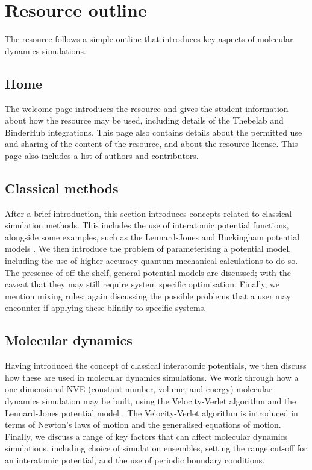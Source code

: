\documentclass[amsmath,amssymb,twocolumn,superscriptaddress]{revtex4-1}
\begin{document}
\section{Resource outline}

The resource follows a simple outline that introduces key aspects of molecular dynamics simulations.

\subsection{Home}

The welcome page introduces the resource and gives the student information about how the resource may be used, including details of the Thebelab and BinderHub integrations.
This page also contains details about the permitted use and sharing of the content of the resource, and about the resource license.
This page also includes a list of authors and contributors.

\subsection{Classical methods}

After a brief introduction, this section introduces concepts related to classical simulation methods.
This includes the use of interatomic potential functions, alongside some examples, such as the Lennard-Jones and Buckingham potential models \cite{lennard-jones_determination_1924,buckingham_classical_1938}.
We then introduce the problem of parameterising a potential model, including the use of higher accuracy quantum mechanical calculations to do so.
The presence of off-the-shelf, general potential models are discussed; with the caveat that they may still require system specific optimisation.
Finally, we mention mixing rules; again discussing the possible problems that a user may encounter if applying these blindly to specific systems.

\subsection{Molecular dynamics}

Having introduced the concept of classical interatomic potentials, we then discuss how these are used in molecular dynamics simulations.
We work through how a one-dimensional NVE (constant number, volume, and energy) molecular dynamics simulation may be built, using the Velocity-Verlet algorithm and the Lennard-Jones potential model \cite{swope_computer_1982,lennard-jones_determination_1924}.
The Velocity-Verlet algorithm is introduced in terms of Newton's laws of motion and the generalised equations of motion.
Finally, we discuss a range of key factors that can affect molecular dynamics simulations, including choice of simulation ensembles, setting the range cut-off for an interatomic potential, and the use of periodic boundary conditions.
\end{document}
